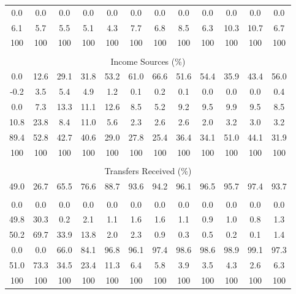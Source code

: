 \begin{tabular}{c c c| c c c c c| c c c| c}
0.0 & 0.0 & 0.0 & 0.0 & 0.0 & 0.0 & 0.0 & 0.0 & 0.0 & 0.0 & 0.0 & 0.0 \\
6.1 & 5.7 & 5.5 & 5.1 & 4.3 & 7.7 & 6.8 & 8.5 & 6.3 & 10.3 & 10.7 & 6.7 \\
\midrule
100 & 100 & 100 & 100 & 100 & 100 & 100 & 100 & 100 & 100 & 100 & 100 \\
\midrule \\
\multicolumn{12}{c}{Income Sources (\%)}  \\
\midrule
0.0 & 12.6 & 29.1 & 31.8 & 53.2 & 61.0 & 66.6 & 51.6 & 54.4 & 35.9 & 43.4 & 56.0 \\
-0.2 & 3.5 & 5.4 & 4.9 & 1.2 & 0.1 & 0.2 & 0.1 & 0.0 & 0.0 & 0.0 & 0.4 \\
0.0 & 7.3 & 13.3 & 11.1 & 12.6 & 8.5 & 5.2 & 9.2 & 9.5 & 9.9 & 9.5 & 8.5 \\
10.8 & 23.8 & 8.4 & 11.0 & 5.6 & 2.3 & 2.6 & 2.6 & 2.0 & 3.2 & 3.0 & 3.2 \\
89.4 & 52.8 & 42.7 & 40.6 & 29.0 & 27.8 & 25.4 & 36.4 & 34.1 & 51.0 & 44.1 & 31.9 \\
\midrule
100 & 100 & 100 & 100 & 100 & 100 & 100 & 100 & 100 & 100 & 100 & 100 \\
\midrule \\
\multicolumn{12}{c}{Transfers Received (\%)}  \\
\midrule
49.0 & 26.7 & 65.5 & 76.6 & 88.7 & 93.6 & 94.2 & 96.1 & 96.5 & 95.7 & 97.4 & 93.7 \\
 & & & & & & & & & & &  \\
0.0 & 0.0 & 0.0 & 0.0 & 0.0 & 0.0 & 0.0 & 0.0 & 0.0 & 0.0 & 0.0 & 0.0 \\
49.8 & 30.3 & 0.2 & 2.1 & 1.1 & 1.6 & 1.6 & 1.1 & 0.9 & 1.0 & 0.8 & 1.3 \\
50.2 & 69.7 & 33.9 & 13.8 & 2.0 & 2.3 & 0.9 & 0.3 & 0.5 & 0.2 & 0.1 & 1.4 \\
0.0 & 0.0 & 66.0 & 84.1 & 96.8 & 96.1 & 97.4 & 98.6 & 98.6 & 98.9 & 99.1 & 97.3 \\
51.0 & 73.3 & 34.5 & 23.4 & 11.3 & 6.4 & 5.8 & 3.9 & 3.5 & 4.3 & 2.6 & 6.3 \\
\midrule
100 & 100 & 100 & 100 & 100 & 100 & 100 & 100 & 100 & 100 & 100 & 100 \\
\bottomrule
\end{tabular}